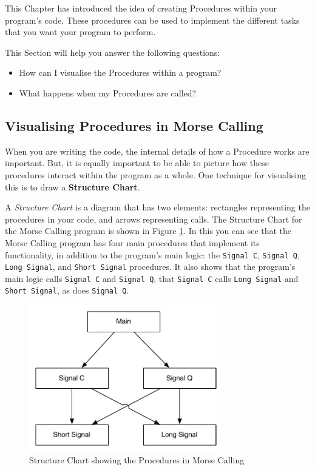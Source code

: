 This Chapter has introduced the idea of creating Procedures within your program's code. These procedures can be used to implement the different tasks that you want your program to perform. 

This Section will help you answer the following questions:
\begin{itemize}
  \item How can I visualise the Procedures within a program?
  \item What happens when my Procedures are called?
\end{itemize}

\subsection{Visualising Procedures in Morse Calling} %
\label{sub:visualising_morse_calling}

When you are writing the code, the internal details of how a Procedure works are important. But, it is equally important to be able to picture how these procedures interact within the program as a whole. One technique for visualising this is to draw a \textbf{Structure Chart}.

A \emph{Structure Chart} is a diagram that has two elements: rectangles representing the procedures in your code, and arrows representing calls. The Structure Chart for the Morse Calling program is shown in Figure \ref{fig:procedure-decl-morsecalling-structure}. In this you can see that the Morse Calling program has four main procedures that implement its functionality, in addition to the program's main logic: the \texttt{Signal C}, \texttt{Signal Q}, \texttt{Long Signal}, and \texttt{Short Signal} procedures. It also shows that the program's main logic calls \texttt{Signal C} and \texttt{Signal Q}, that \texttt{Signal C} calls \texttt{Long Signal} and \texttt{Short Signal}, as does \texttt{Signal Q}.

\begin{figure}[htbp]
   \centering
   \includegraphics[width=0.75\textwidth]{./topics/procedure-decl/diagrams/MorseCallingStructureChart} 
   \caption{Structure Chart showing the Procedures in Morse Calling}
   \label{fig:procedure-decl-morsecalling-structure}
\end{figure}


